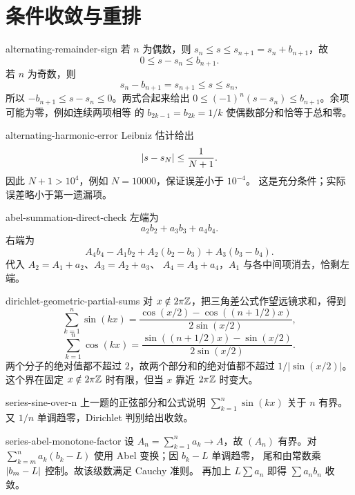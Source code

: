 \chapter{条件收敛与重排}
\label{chap:conditional-convergence-rearrangement-solutions}

\begin{solution}{alternating-remainder-sign}
若 \(n\) 为偶数，则 \(s_n\le s\le s_{n+1}=s_n+b_{n+1}\)，故
\[
 0\le s-s_n\le b_{n+1}.
\]
若 \(n\) 为奇数，则
\[
 s_n-b_{n+1}=s_{n+1}\le s\le s_n,
\]
所以 \(-b_{n+1}\le s-s_n\le0\)。两式合起来给出
\(0\le(-1)^n(s-s_n)\le b_{n+1}\)。余项可能为零，例如连续两项相等
的 \(b_{2k-1}=b_{2k}=1/k\) 使偶数部分和恰等于总和零。
\end{solution}

\begin{solution}{alternating-harmonic-error}
Leibniz 估计给出
\[
 \left|s-s_N\right|\le\frac1{N+1}.
\]
因此 \(N+1>10^4\)，例如 \(N=10000\)，保证误差小于 \(10^{-4}\)。
这是充分条件；实际误差略小于第一遗漏项。
\end{solution}

\begin{solution}{abel-summation-direct-check}
左端为
\[
 a_2b_2+a_3b_3+a_4b_4.
\]
右端为
\[
 A_4b_4-A_1b_2+A_2(b_2-b_3)+A_3(b_3-b_4).
\]
代入 \(A_2=A_1+a_2\)、\(A_3=A_2+a_3\)、
\(A_4=A_3+a_4\)，\(A_1\) 与各中间项消去，恰剩左端。
\end{solution}

\begin{solution}{dirichlet-geometric-partial-sums}
对 \(x\notin2\pi\mathbb{Z}\)，把三角差公式作望远镜求和，得到
\[
 \sum_{k=1}^n\sin(kx)
 =\frac{\cos(x/2)-\cos((n+1/2)x)}{2\sin(x/2)},
\]
\[
 \sum_{k=1}^n\cos(kx)
 =\frac{\sin((n+1/2)x)-\sin(x/2)}{2\sin(x/2)}.
\]
两个分子的绝对值都不超过 \(2\)，故两个部分和的绝对值都不超过
\(1/|\sin(x/2)|\)。这个界在固定 \(x\notin2\pi\mathbb{Z}\) 时有限，但当 \(x\) 靠近
\(2\pi\mathbb{Z}\) 时变大。
\end{solution}

\begin{solution}{series-sine-over-n}
上一题的正弦部分和公式说明 \(\sum_{k=1}^n\sin(kx)\) 关于 \(n\) 有界。
又 \(1/n\) 单调趋零，Dirichlet 判别给出收敛。
\end{solution}

\begin{solution}{series-abel-monotone-factor}
设 \(A_n=\sum_{k=1}^na_k\to A\)，故 \((A_n)\) 有界。对
\(\sum_{k=m}^na_k(b_k-L)\) 使用 Abel 变换；因 \(b_k-L\) 单调趋零，
尾和由常数乘 \(\left|b_m-L\right|\) 控制。故该级数满足 Cauchy 准则。
再加上 \(L\sum a_n\) 即得 \(\sum a_nb_n\) 收敛。
\end{solution}

